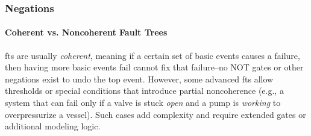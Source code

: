 \subsubsection{Negations}
\paragraph{Coherent vs. Noncoherent Fault Trees}
\acrshort{ft}s are usually \emph{coherent}, meaning if a certain set of basic events causes a failure, then having more basic events fail cannot fix that failure--no NOT gates or other negations exist to undo the top event. However, some advanced \acrshort{ft}s allow thresholds or special conditions that introduce partial noncoherence (e.g., a system that can fail only if a valve is stuck \emph{open} and a pump is \emph{working} to overpressurize a vessel). Such cases add complexity and require extended gates or additional modeling logic.
